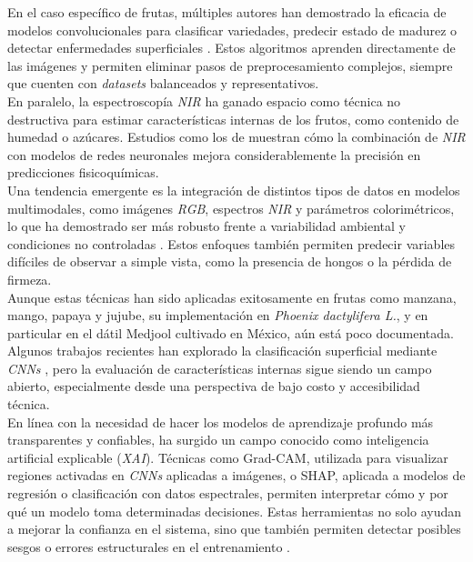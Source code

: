 En el caso específico de frutas, múltiples autores han demostrado la eficacia de modelos convolucionales para clasificar variedades, predecir estado de madurez o detectar enfermedades superficiales \parencite{rybacki_convolutional_2024, gill_fruit_2023, almomen_date_2023}. Estos algoritmos aprenden directamente de las imágenes y permiten eliminar pasos de preprocesamiento complejos, siempre que cuenten con \textit{datasets} balanceados y representativos.\\

En paralelo, la espectroscopía \textit{NIR} ha ganado espacio como técnica no destructiva para estimar características internas de los frutos, como contenido de humedad o azúcares. Estudios como los de \parencite{yuan_determination_2025, wang_improving_2025, chen_prediction_2024} muestran cómo la combinación de \textit{NIR} con modelos de redes neuronales mejora considerablemente la precisión en predicciones fisicoquímicas.\\

Una tendencia emergente es la integración de distintos tipos de datos en modelos multimodales, como imágenes \textit{RGB}, espectros \textit{NIR} y parámetros colorimétricos, lo que ha demostrado ser más robusto frente a variabilidad ambiental y condiciones no controladas \parencite{said_smartripen_2025, passos_deep_2023}. Estos enfoques también permiten predecir variables difíciles de observar a simple vista, como la presencia de hongos o la pérdida de firmeza.\\

Aunque estas técnicas han sido aplicadas exitosamente en frutas como manzana, mango, papaya y jujube, su implementación en \textit{Phoenix dactylifera L.}, y en particular en el dátil Medjool cultivado en México, aún está poco documentada. Algunos trabajos recientes han explorado la clasificación superficial mediante \textit{CNNs} \parencite{perez-perez_evaluation_2021}, pero la evaluación de características internas sigue siendo un campo abierto, especialmente desde una perspectiva de bajo costo y accesibilidad técnica.\\

En línea con la necesidad de hacer los modelos de aprendizaje profundo más transparentes y confiables, ha surgido un campo conocido como inteligencia artificial explicable (\textit{XAI}). Técnicas como Grad-CAM, utilizada para visualizar regiones activadas en \textit{CNNs} aplicadas a imágenes, o SHAP, aplicada a modelos de regresión o clasificación con datos espectrales, permiten interpretar cómo y por qué un modelo toma determinadas decisiones. Estas herramientas no solo ayudan a mejorar la confianza en el sistema, sino que también permiten detectar posibles sesgos o errores estructurales en el entrenamiento \parencite{russel_wavelet_2024, gupta_fruveg-net_2024}.\\

